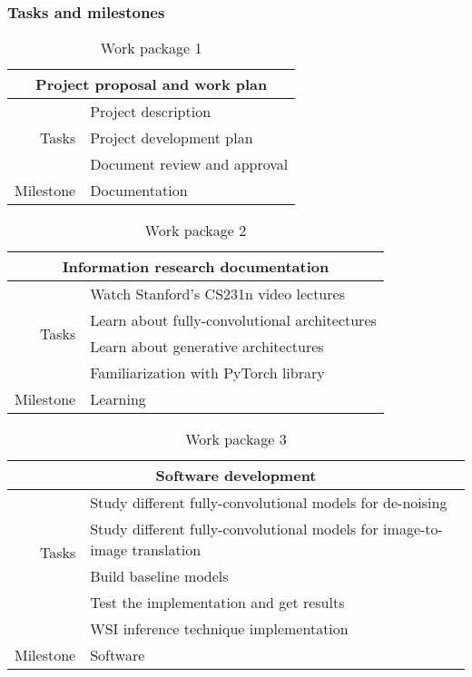 \documentclass[../main.tex]{subfiles}
\begin{document}
\subsubsection{Tasks and milestones}

\begin{table}[H]
\centering
\begin{tabular}{rl}
\toprule
\multicolumn{2}{c}{Project proposal and work plan} \\
\midrule
\multirow{3}{*}{Tasks}
& Project description \\
& Project development plan \\
& Document review and approval \\
\midrule
Milestone & Documentation \\
\bottomrule
\end{tabular}
\caption{Work package 1}
\label{tab:wc1}
\end{table}

\begin{table}[H]
\centering
\begin{tabular}{rl}
\toprule
\multicolumn{2}{c}{Information research documentation} \\
\midrule
\multirow{4}{*}{Tasks}
& Watch Stanford’s CS231n video lectures \\
& Learn about fully-convolutional architectures \\
& Learn about generative architectures \\
& Familiarization with PyTorch library \\
\midrule
Milestone & Learning \\
\bottomrule
\end{tabular}
\caption{Work package 2}
\label{tab:wc1}
\end{table}

\begin{table}[H]
\centering
\begin{tabular}{rl}
\toprule
\multicolumn{2}{c}{Software development} \\
\midrule
\multirow{4}{*}{Tasks}
& Study different fully-convolutional models for de-noising \\
& Study different fully-convolutional models for image-to-image translation \\
& Build baseline models \\
& Test the implementation and get results \\
& WSI inference technique implementation \\
\midrule
Milestone & Software \\
\bottomrule
\end{tabular}
\caption{Work package 3}
\label{tab:wc1}
\end{table}
\end{document}
